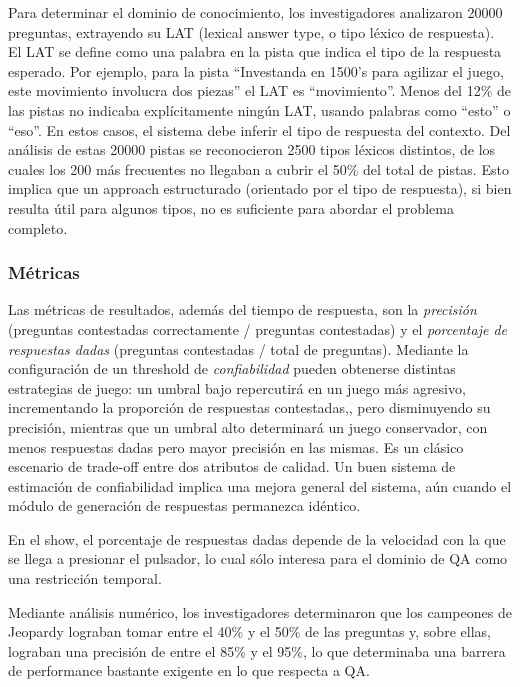 Para determinar el dominio de conocimiento, los investigadores
analizaron 20000 preguntas, extrayendo su LAT (lexical answer type, o
tipo léxico de respuesta). El LAT se define como una palabra en la
pista que indica el tipo de la respuesta esperado. Por ejemplo, para la
pista {\textquotedblleft}Investanda en 1500{\textquoteright}s para
agilizar el juego, este movimiento involucra dos
piezas{\textquotedblright} el LAT es
{\textquotedblleft}movimiento{\textquotedblright}. Menos del 12\% de
las pistas no indicaba explícitamente ningún LAT, usando palabras
como {\textquotedblleft}esto{\textquotedblright} o
{\textquotedblleft}eso{\textquotedblright}. En estos casos, el sistema
debe inferir el tipo de respuesta del contexto. Del análisis de estas
20000 pistas se reconocieron 2500 tipos léxicos distintos, de los
cuales los 200 más frecuentes no llegaban a cubrir el 50\% del total
de pistas. Esto implica que un approach estructurado (orientado por el
tipo de respuesta), si bien resulta útil para algunos tipos, no es
suficiente para abordar el problema completo.

\subsubsection*{Métricas}

Las métricas de resultados, además del tiempo de respuesta, son la
\textit{precisión} (preguntas contestadas correctamente / preguntas
contestadas) y el \textit{porcentaje de respuestas dadas }(preguntas
contestadas / total de preguntas). Mediante la configuración de un
threshold de \textit{confiabilidad} pueden obtenerse distintas
estrategias de juego: un umbral bajo repercutirá en un juego más
agresivo, incrementando la proporción de respuestas contestadas,,
pero disminuyendo su precisión, mientras que un umbral alto
determinará un juego conservador, con menos respuestas dadas pero
mayor precisión en las mismas. Es un clásico escenario de trade-off
entre dos atributos de calidad. Un buen sistema de estimación de
confiabilidad implica una mejora general del sistema, aún cuando el
módulo de generación de respuestas permanezca idéntico.


\bigskip

En el show, el porcentaje de respuestas dadas depende de la velocidad
con la que se llega a presionar el pulsador, lo cual sólo interesa
para el dominio de QA como una restricción temporal. 


\bigskip

Mediante análisis numérico, los investigadores determinaron que los
campeones de Jeopardy lograban tomar entre el 40\% y el 50\% de las
preguntas y, sobre ellas, lograban una precisión de entre el 85\% y
el 95\%, lo que determinaba una barrera de performance bastante
exigente en lo que respecta a QA.


